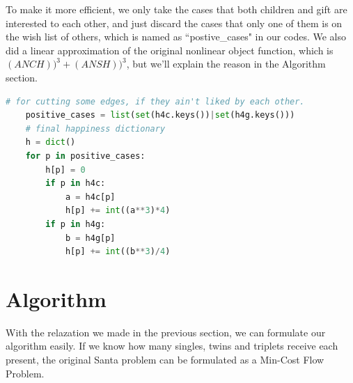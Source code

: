\documentclass[12pt]{article}
\begin{document}
To make it more efficient, we only take the cases that both children and gift are interested to each other, and just discard the cases that only one of them is on the wish list of others, which is named as ``postive\_cases" in our codes. We also did a linear approximation of the original nonlinear object function, which is $(ANCH))^3 + (ANSH))^3$, but we'll explain the reason in the Algorithm section.
\begin{lstlisting}[language = Python, caption = TotalHappiness]
# for cutting some edges, if they ain't liked by each other.
    positive_cases = list(set(h4c.keys())|set(h4g.keys()))
    # final happiness dictionary
    h = dict()
    for p in positive_cases:
        h[p] = 0
        if p in h4c:
            a = h4c[p]
            h[p] += int((a**3)*4)
        if p in h4g:
            b = h4g[p]
            h[p] += int((b**3)/4)
\end{lstlisting}

\section{Algorithm}
With the relazation we made in the previous section, we can formulate our algorithm easily. If we know how many singles, twins and triplets receive each present, the original Santa problem can be formulated as a Min-Cost Flow Problem.
\end{document}
